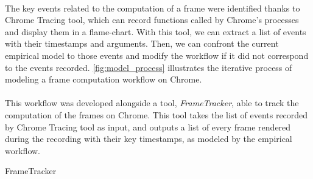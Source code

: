     \paragraph{}
    The key events related to the computation of a frame were identified thanks to Chrome Tracing tool, which can record functions called by Chrome's processes and display them in a flame-chart. With this tool, we can extract a list of events with their timestamps and arguments. Then, we can confront the current empirical model to those events and modify the workflow if it did not correspond to the events recorded. \autoref{fig:model_process} illustrates the iterative process of modeling a frame computation workflow on Chrome.
    
    \paragraph{}
    This workflow was developed alongside a tool, \textit{FrameTracker}, able to track the computation of the frames on Chrome. This tool takes the list of events recorded by Chrome Tracing tool as input, and outputs a list of every frame rendered during the recording with their key timestamps, as modeled by the empirical workflow. 


    \begin{algorithm}
        \SetAlgoLined
        \caption{FrameTracker}
        \label{alg:frametracker}
    \end{algorithm}




